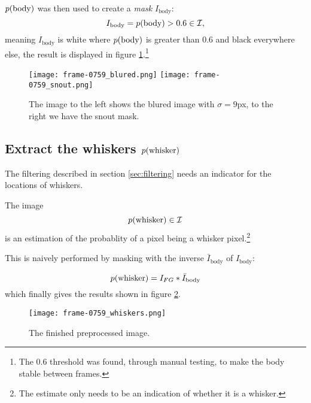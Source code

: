 $p{(\text{body})}$ was then used to create a \emph{mask} $I_{\text{body}}$:
\begin{equation}
  I_{\text{body}} = p{(\text{body})}>0.6 \in \mathcal{I},
\end{equation}
meaning $I_{\text{body}}$ is white where $p{(\text{body})}$ is greater than
0.6 and black everywhere else, the result is displayed in figure \ref{fig:blured_snout}.\footnote{The 0.6 threshold was found,
through manual testing, to make the body stable between frames.}

\begin{figure}
\begin{center}
    \texttt{[image: frame-0759\_blured.png]}
    \texttt{[image: frame-0759\_snout.png]}
\end{center}
\caption{The image to the left shows the blured image with ${\sigma=9}$px, to the right we have the snout mask.}
\label{fig:blured_snout}
\end{figure}

\subsection{Extract the whiskers $p{(\text{whisker})}$}
\label{sec:findwhisker}
The filtering described in section \ref{sec:filtering} needs an
indicator for the locations of whiskers.

\begin{definition}
  The image
  \begin{equation}
    p{(\text{whisker})}\in \mathcal{I}
  \end{equation} is an estimation of the probablity of a pixel being
  a whisker pixel.\footnote{The estimate only needs to be an
    indication of whether it is a whisker.}
\end{definition}

This is naively performed by masking with the inverse
$\bar{I}_{\text{body}}$ of $I_{\text{body}}$:

\begin{equation}
  p{(\text{whisker})} = I_{FG} * \bar{I}_{\text{body}}
\end{equation}
which finally gives the results shown in figure \ref{fig:whiskers}.

\begin{figure}
\begin{center}
    \texttt{[image: frame-0759\_whiskers.png]}
\end{center}
\caption{The finished preprocessed image.}
\label{fig:whiskers}
\end{figure}


